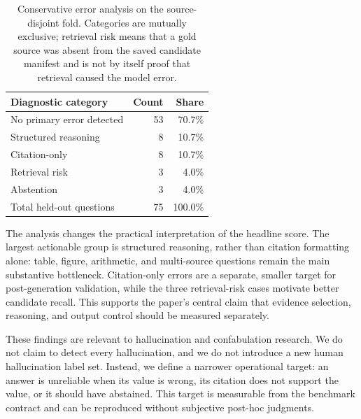 \documentclass[11pt]{article}
\begin{document}
\begin{table}[t]
\centering
\small
\begin{tabular}{lrr}
\toprule
Diagnostic category & Count & Share \\
\midrule
No primary error detected & 53 & 70.7\% \\
Structured reasoning & 8 & 10.7\% \\
Citation-only & 8 & 10.7\% \\
Retrieval risk & 3 & 4.0\% \\
Abstention & 3 & 4.0\% \\
\midrule
Total held-out questions & 75 & 100.0\% \\
\bottomrule
\end{tabular}
\caption{Conservative error analysis on the source-disjoint fold. Categories are mutually exclusive; retrieval risk means that a gold source was absent from the saved candidate manifest and is not by itself proof that retrieval caused the model error.}
\label{tab:error-analysis}
\end{table}

The analysis changes the practical interpretation of the headline score. The largest actionable group is structured reasoning, rather than citation formatting alone: table, figure, arithmetic, and multi-source questions remain the main substantive bottleneck. Citation-only errors are a separate, smaller target for post-generation validation, while the three retrieval-risk cases motivate better candidate recall. This supports the paper's central claim that evidence selection, reasoning, and output control should be measured separately.

These findings are relevant to hallucination and confabulation research. We do not claim to detect every hallucination, and we do not introduce a new human hallucination label set. Instead, we define a narrower operational target: an answer is unreliable when its value is wrong, its citation does not support the value, or it should have abstained. This target is measurable from the benchmark contract and can be reproduced without subjective post-hoc judgments.
\end{document}
